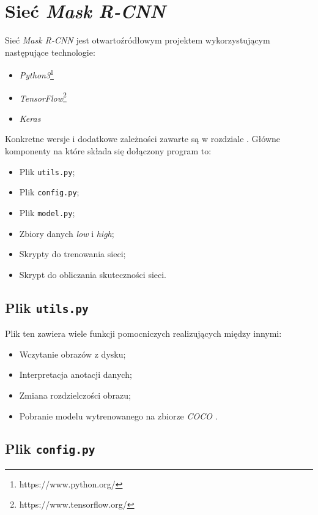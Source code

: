 \newpage
\section{Sieć \textit{Mask R-CNN}}

Sieć \textit{Mask R-CNN} \cite{matterport-mask-rcnn} jest otwartoźródłowym projektem wykorzystującym następujące technologie:
\begin{itemize}
  \item \textit{Python3}\footnote{https://www.python.org/}
  \item \textit{TensorFlow}\footnote{https://www.tensorflow.org/}
  \item \textit{Keras} \cite{keras}
\end{itemize}

Konkretne wersje i dodatkowe zależności zawarte są w rozdziale . Główne komponenty na które składa się dołączony program to:

\begin{itemize}
\item Plik \texttt{utils.py};
  \item Plik \texttt{config.py};
  \item Plik  \texttt{model.py};
  \item Zbiory danych \textit{low} i \textit{high};
  \item Skrypty do trenowania sieci;
  \item Skrypt do obliczania skuteczności sieci.
\end{itemize}

\subsection*{Plik \texttt{utils.py}}

Plik ten zawiera wiele funkcji pomocniczych realizujących między innymi:
\begin{itemize}
  \item Wczytanie obrazów z dysku;
  \item Interpretacja anotacji danych;
  \item Zmiana rozdzielczości obrazu;
  \item Pobranie modelu wytrenowanego na zbiorze \textit{COCO} \cite{coco}.
\end{itemize}

\subsection*{Plik \texttt{config.py}}

